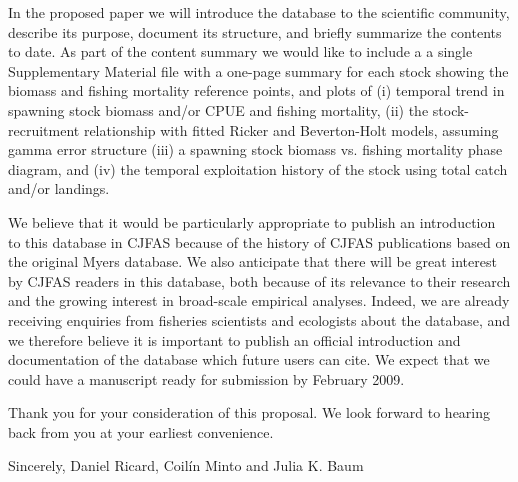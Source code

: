 \documentclass[10pt,oneside]{refletter}
\begin{document}
In the proposed paper we will introduce the database to the scientific community, describe its purpose, document its structure, and briefly summarize the contents to date. As part of the content summary we would like to include a a single Supplementary Material file with a one-page summary for each stock showing the biomass and fishing mortality reference points, and plots of (i) temporal trend in spawning stock biomass and/or CPUE and fishing mortality, (ii) the stock-recruitment relationship with fitted Ricker and Beverton-Holt models, assuming gamma error structure (iii) a spawning stock biomass vs. fishing mortality phase diagram, and (iv) the temporal exploitation history of the stock using total catch and/or landings. 

We believe that it would be particularly appropriate to publish an introduction to this database in CJFAS because of the history of CJFAS publications based on the original Myers database. We also anticipate that there will be great interest by CJFAS readers in this database, both because of its relevance to their research and the growing interest in broad-scale empirical analyses. Indeed, we are already receiving enquiries from fisheries scientists and ecologists about the database, and we therefore believe it is important to publish an official introduction and documentation of the database which future users can cite. We expect that we could have a manuscript ready for submission by February 2009. 

Thank you for your consideration of this proposal. We look forward to hearing back from you at your earliest convenience. 

Sincerely,
Daniel Ricard, Coil\'in Minto and Julia K. Baum


\end{document}
